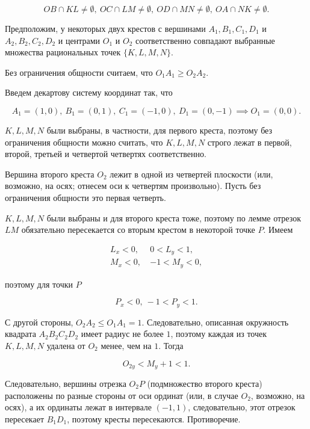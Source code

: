 		\begin{equation*}
			OB \cap KL \ne \emptyset, \
			OC \cap LM \ne \emptyset, \
			OD \cap MN \ne \emptyset, \
			OA \cap NK \ne \emptyset.
		\end{equation*}

		Предположим, у некоторых двух крестов с вершинами $A_1, B_1, C_1, D_1$ и $A_2, B_2, C_2, D_2$ и центрами $O_1$ и $O_2$ соответственно совпадают выбранные множества рациональных точек $\{K, L, M, N\}$.

		Без ограничения общности считаем, что $O_1 A_1 \ge O_2 A_2$.

		Введем декартову систему координат так, что

		\begin{equation*}
			A_1 = (1, 0), \ B_1 = (0, 1), \ C_1 = (-1, 0), \ D_1 = (0, -1) \implies O_1 = (0, 0).
		\end{equation*}

		$K, L, M, N$ были выбраны, в частности, для первого креста, поэтому без ограничения общности можно считать, что $K, L, M, N$ строго лежат в первой, второй, третьей и четвертой четвертях соответственно.

		Вершина второго креста $O_2$ лежит в одной из четвертей плоскости (или, возможно, на осях; отнесем оси к четвертям произвольно). Пусть без ограничения общности это первая четверть.

		$K, L, M, N$ были выбраны и для второго креста тоже, поэтому по лемме отрезок $LM$ обязательно пересекается со вторым крестом в некоторой точке $P$. Имеем

		\begin{align*}
			L_x < 0, \ & 0 < L_y < 1, \\
			M_x < 0, \ & -1 < M_y < 0,
		\end{align*}

		поэтому для точки $P$

		\begin{equation*}
			P_x < 0, \ -1 < P_y < 1.
		\end{equation*}

		С другой стороны, $O_2 A_2 \le O_1 A_1 = 1$. Следовательно, описанная окружность квадрата $A_2 B_2 C_2 D_2$ имеет радиус не более $1$, поэтому каждая из точек $K, L, M, N$ удалена от $O_2$ менее, чем на $1$. Тогда

		\begin{equation*}
			O_{2y} < M_y + 1 < 1.
		\end{equation*}

		Следовательно, вершины отрезка $O_2 P$ (подмножество второго креста) расположены по разные стороны от оси ординат (или, в случае $O_2$, возможно, на осях), а их ординаты лежат в интервале $(-1, 1)$, следовательно, этот отрезок пересекает $B_1 D_1$, поэтому кресты пересекаются. Противоречие.


